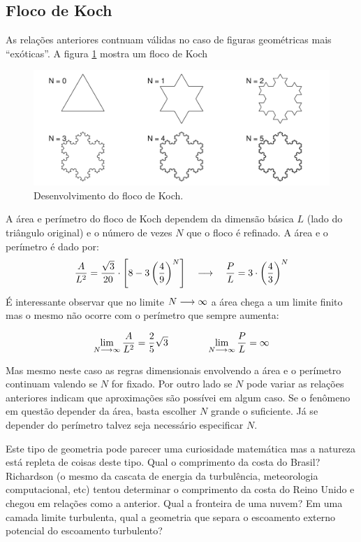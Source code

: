 \subsection{Floco de Koch}

As relações anteriores contnuam válidas no caso de figuras geométricas mais ``exóticas''. A figura \ref{fig:koch} mostra um floco de Koch

\begin{figure}
\centering
\includegraphics[width=\textwidth]{./figuras/koch.pdf}
\caption{Desenvolvimento do floco de Koch.}
\label{fig:koch}
\end{figure}

A área e perímetro do floco de Koch dependem da dimensão básica $L$ (lado do triângulo original) e o número de vezes $N$ que o floco é refinado. A área e o perímetro é dado por:
\[
\frac{A}{L^2} = \frac{\sqrt{3}}{20} \cdot \left[8 - 3\left(\frac{4}{9}\right)^N\right] \quad\longrightarrow\quad \frac{P}{L} = 3\cdot\left(\frac{4}{3}\right)^N
\]
É interessante observar que no limite $N\longrightarrow\infty$ a área chega a um limite finito mas o mesmo não ocorre com o perímetro que sempre aumenta:

\[
\lim_{N\longrightarrow\infty} \frac{A}{L^2} = \frac{2}{5}\sqrt{3} \qquad\qquad \lim_{N\longrightarrow\infty}\frac{P}{L} = \infty
\]

Mas mesmo neste caso as regras dimensionais envolvendo a área e o perímetro continuam valendo se $N$ for fixado. Por outro lado se $N$ pode variar as relações anteriores indicam que aproximações são possívei em algum caso. Se o fenômeno em questão depender da área, basta escolher $N$ grande o suficiente. Já se depender do perímetro talvez seja necessário especificar $N$.

Este tipo de geometria pode parecer uma curiosidade matemática mas a natureza está repleta de coisas deste tipo. Qual o comprimento da costa do Brasil? Richardson (o mesmo da cascata de energia da turbulência, meteorologia computacional, etc) tentou determinar o comprimento da costa do Reino Unido e chegou em relações como a anterior. Qual a fronteira de uma nuvem? Em uma camada limite turbulenta, qual a geometria que separa o escoamento externo potencial do escoamento turbulento?

